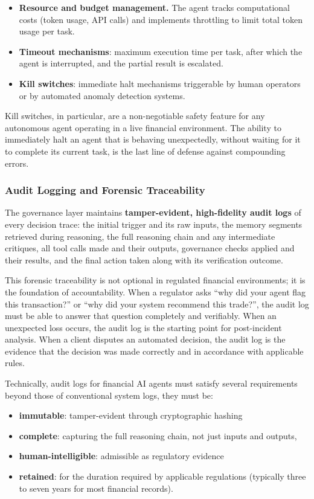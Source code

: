 \documentclass{article}
\begin{document}
\begin{itemize}
    \item  \textbf{Resource and budget management.} The agent tracks computational costs (token usage, API calls) and implements throttling to limit total token usage per task.
  \item \textbf{Timeout mechanisms}: maximum execution time per task, after which the agent is interrupted, and the partial result is escalated.
  \item \textbf{Kill switches}: immediate halt mechanisms triggerable by human operators or by automated anomaly detection systems.
\end{itemize}

Kill switches, in particular, are a non-negotiable safety feature for any autonomous agent operating in a live financial environment. The ability to immediately halt an agent that is behaving unexpectedly, without waiting for it to complete its current task, is the last line of defense against compounding errors.

\subsubsection{Audit Logging and Forensic Traceability}

The governance layer maintains \textbf{tamper-evident, high-fidelity audit logs} of every decision trace: the initial trigger and its raw inputs, the memory segments retrieved during reasoning, the full reasoning chain and any intermediate critiques, all tool calls made and their outputs, governance checks applied and their results, and the final action taken along with its verification outcome.

This forensic traceability is not optional in regulated financial environments; it is the foundation of accountability. When a regulator asks ``why did your agent flag this transaction?'' or ``why did your system recommend this trade?'', the audit log must be able to answer that question completely and verifiably. When an unexpected loss occurs, the audit log is the starting point for post-incident analysis. When a client disputes an automated decision, the audit log is the evidence that the decision was made correctly and in accordance with applicable rules.

Technically, audit logs for financial AI agents must satisfy several requirements beyond those of conventional system logs, they must be:
\begin{itemize}
    \item \textbf{immutable}: tamper-evident through cryptographic hashing 
    \item \textbf{complete}: capturing the full reasoning chain, not just inputs and outputs, 
    \item \textbf{human-intelligible}: admissible as regulatory evidence 
    \item \textbf{retained}: for the duration required by applicable regulations (typically three to seven years for most financial records).
\end{itemize}
\end{document}
